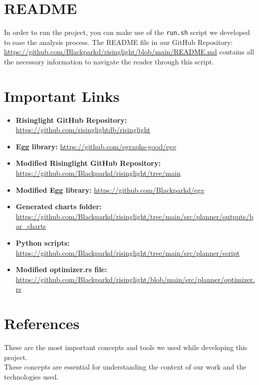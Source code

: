 \documentclass[a4paper,12pt]{scrreprt}
\begin{document}
\section{README}

In order to run the project, you can make use of the \texttt{run.sh} script we developed to ease the analysis process. The README file in our GitHub Repository: \url{https://github.com/Blackparkd/risinglight/blob/main/README.md} contains all the necessary information to navigate the reader through this script. \\

\section{Important Links}
\begin{itemize}
    \item \textbf{Risinglight GitHub Repository:} \url{https://github.com/risinglightdb/risinglight}
    \item \textbf{Egg library:} \url{https://github.com/egraphs-good/egg}
    \item \textbf{Modified Risinglight GitHub Repository:} \url{https://github.com/Blackparkd/risinglight/tree/main}
    \item \textbf{Modified Egg library:} \url{https://github.com/Blackparkd/egg}
    \item \textbf{Generated charts folder:} \url{https://github.com/Blackparkd/risinglight/tree/main/src/planner/outputs/bar_charts}
    \item \textbf{Python scripts:} \url{https://github.com/Blackparkd/risinglight/tree/main/src/planner/script}
    \item \textbf{Modified optimizer.rs file:} \url{https://github.com/Blackparkd/risinglight/blob/main/src/planner/optimizer.rs}
\end{itemize}

\section{References}
These are the most important concepts and tools we used while developing this project. \\
These concepts are essential for understanding the context of our work and the technologies used.
\end{document}
